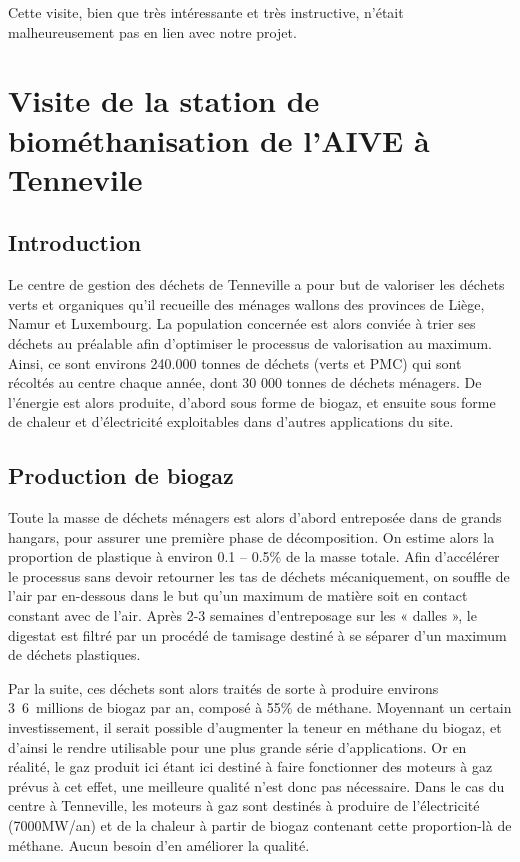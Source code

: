 Cette visite, bien que très intéressante et très instructive, n'était
malheureusement pas en lien avec notre projet.

\section{Visite de la station de biométhanisation de l'AIVE à Tennevile}
\subsection{Introduction}
Le centre de gestion des déchets de Tenneville a pour but de valoriser les 
déchets verts et organiques qu’il recueille des ménages wallons des provinces de 
Liège, Namur et Luxembourg. La population concernée est alors conviée à trier ses déchets 
au préalable afin d’optimiser le processus de valorisation au maximum. 
Ainsi, ce sont environs 240.000 tonnes de déchets (verts et PMC) qui sont récoltés 
au centre chaque année, dont 30 000 tonnes de déchets ménagers. De l’énergie est alors produite, 
d’abord sous forme de biogaz, et ensuite sous forme de chaleur et d’électricité exploitables 
dans d’autres applications du site.

\subsection{Production de biogaz}
Toute la masse de déchets ménagers est alors d’abord entreposée dans de grands hangars, 
pour assurer une première phase de décomposition. On estime alors la proportion de plastique 
à environ 0.1 – 0.5\% de la masse totale. Afin d’accélérer le processus sans devoir retourner 
les tas de déchets mécaniquement, on souffle de l’air par en-dessous dans le but qu’un maximum 
de matière soit en contact constant avec de l’air. Après 2-3 semaines d’entreposage sur 
les « dalles », le digestat est filtré par un procédé de tamisage destiné à se séparer d’un maximum de déchets plastiques. 

Par la suite, ces déchets sont alors traités de sorte à produire environs \unit{3.6 millions}{\meter\cubed}
de biogaz par an, composé à 55\% de méthane. Moyennant un certain investissement, il 
serait possible d’augmenter la teneur en méthane du biogaz, et d’ainsi le rendre utilisable 
pour une plus grande série d’applications.
Or en réalité, le gaz produit ici étant ici destiné à faire fonctionner des moteurs à gaz prévus à cet effet, 
une meilleure qualité n’est donc pas nécessaire. Dans le cas du centre à Tenneville, les moteurs 
à gaz sont destinés à produire de l’électricité (7000MW/an) et de la chaleur à partir de biogaz 
contenant cette proportion-là de méthane. Aucun besoin d’en améliorer la qualité. 

